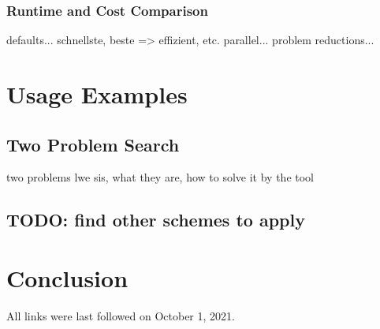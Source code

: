 \documentclass[
  a4paper,  %
  twoside,  %
  bibliography=totoc,
  headsepline,
  cleardoublepage=empty,
  parskip=half,
  draft=false
]{scrbook}
\begin{document}
\subsection{Runtime and Cost Comparison}
defaults...
schnellste, beste => effizient, etc. parallel... problem reductions...



\chapter{Usage Examples}
\section{Two Problem Search}
two problems lwe sis, what they are, how to solve it by the tool
\section{TODO: find other schemes to apply}


\chapter{Conclusion}

\printbibliography

All links were last followed on October 1, 2021.


\pagestyle{empty}
\renewcommand*{\chapterpagestyle}{empty}
\Versicherung
\end{document}
